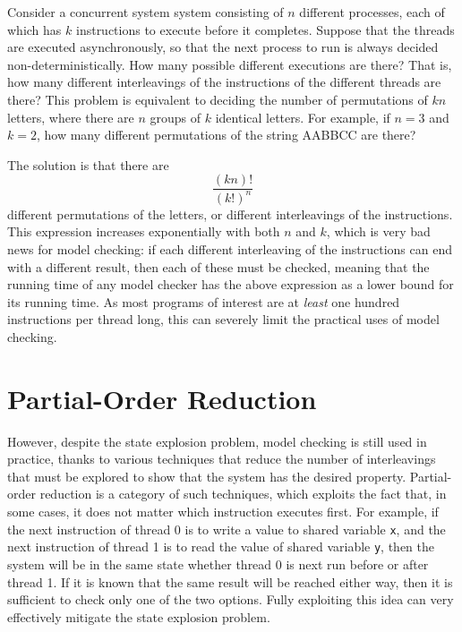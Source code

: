 \documentclass[12pt,a4paper,twoside,openright]{report}
\begin{document}
Consider a concurrent system system consisting
of $n$ different processes, each of which
has $k$ instructions to execute before it
completes. Suppose that the threads are
executed asynchronously, so that the next
process to run is always decided non-deterministically.
How many possible different executions are there?
That is, how many different interleavings of
the instructions of the different threads are
there? This problem is equivalent to deciding
the number of permutations of $kn$ letters,
where there are $n$ groups of $k$ identical
letters. For example, if $n = 3$ and $k = 2$,
how many different permutations of the string
\textsc{AABBCC} are there?

The solution is that there are
\[\frac{(kn)!}{(k!)^n}\]
different permutations of the letters,
or different interleavings of the instructions.
This expression increases exponentially with
both $n$ and $k$, which is very bad news for
model checking: if each different interleaving
of the instructions can end with a different
result, then each of these must be checked,
meaning that the running time of any model
checker has the above expression as a lower
bound for its running time. As most programs
of interest are at \emph{least}
one hundred instructions per thread long,
this can severely limit
the practical uses of model checking.

\section{Partial-Order Reduction}

However, despite the state explosion problem, model
checking is still used in practice, thanks
to various techniques that
reduce the number of interleavings that must
be explored to show that the system has the
desired property. Partial-order reduction
is a category of such techniques, which
exploits the fact that, in some cases, it
does not matter which instruction executes
first. For example, if the next instruction
of thread 0 is to write a value to shared
variable \texttt{x}, and the next instruction
of thread 1 is to read
the value of shared variable \texttt{y}, then
the system will be in the same state whether
thread 0 is next run before or after thread 1. If
it is known that the same result will be reached
either way, then it is sufficient to check
only one of the two options. Fully exploiting
this idea can very effectively mitigate the
state explosion problem.
\end{document}
